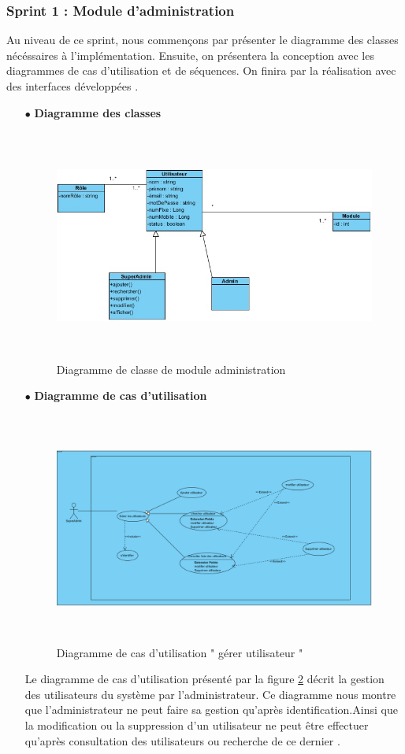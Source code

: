 \documentclass{article}
\begin{document}
\subsubsection{Sprint 1 : Module d'administration}
Au niveau de ce sprint, nous commençons par présenter le diagramme des classes nécéssaires à l'implémentation. Ensuite, on présentera
la conception avec les diagrammes de cas d'utilisation et de  séquences. On finira par la réalisation avec des interfaces développées .
\begin{enumerate}
\item[$\bullet$] \textbf{ Diagramme des classes}
\begin{figure}[H]
\centering
\includegraphics[height=3in]{DiagClass1.jpg}
\caption[Figure9 : Diagramme de classe de module administration]{Diagramme de classe de module administration}
\label{fig:pic9}
\end{figure}
\item[$\bullet$] \textbf{ Diagramme de cas d'utilisation}\\

\begin{figure}[H]
\centering
\includegraphics[height=3in]{UseCaseDiagram2.png}
\caption[Figure10 : Diagramme de cas d'utilisation " gérer utilisateur "]{Diagramme de cas d'utilisation " gérer utilisateur "}
\label{fig:pic10}
\end{figure}
Le diagramme de cas d'utilisation présenté par la figure \ref{fig:pic10} décrit la gestion des
utilisateurs du système par l'administrateur. Ce diagramme nous montre que l'administrateur ne peut faire sa gestion qu'après identification.Ainsi que la modification ou la
suppression d'un utilisateur ne peut être effectuer qu'après consultation des utilisateurs
ou recherche de ce dernier .
\end{enumerate}
\end{document}
